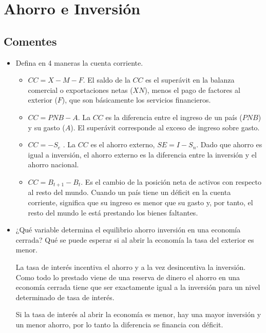 \documentclass[a4paper]{article}
\begin{document}
\section{Ahorro e Inversión}

\subsection{Comentes}

\begin{itemize}
    \item[a)] Defina en 4 maneras la cuenta corriente. 
    \begin{solution}
        \begin{itemize}
            \item $CC = X-M-F$. El saldo de la $CC$ es el superávit en la balanza comercial o exportaciones netas ($XN$), menos el pago de factores al exterior ($F$), que son básicamente los servicios financieros.
            \item $CC = PNB - A$. La $CC$ es la diferencia entre el ingreso de un país ($PNB$) y su gasto ($A$). El superávit corresponde al exceso de ingreso sobre gasto.
            \item $CC = -S_e$ . La $CC$ es el ahorro externo, $SE = I - S_n$. Dado que ahorro es igual a inversión, el ahorro externo es la diferencia entre la inversión y el ahorro nacional.
            \item $CC = B_{t+1} - B_{t}$. Es el cambio de la posición neta de activos con respecto al resto del mundo. Cuando un país tiene un déficit en la cuenta corriente, significa que su ingreso es menor que su gasto y, por tanto, el resto del mundo le está prestando los bienes faltantes.
        \end{itemize}
    \end{solution}
    \item[b)] ¿Qué variable determina el equilibrio ahorro inversión en una economía cerrada? Qué se puede esperar si al abrir la economía la tasa del exterior es menor. 
    \begin{solution}
        La tasa de interés incentiva el ahorro y a la vez desincentiva la inversión. Como todo lo prestado viene de una reserva de dinero el ahorro en una economía cerrada tiene que ser exactamente igual a la inversión para un nivel determinado de tasa de interés. 

        Si la tasa de interés al abrir la economía es menor, hay una mayor inversión y un menor ahorro, por lo tanto la diferencia se financia con déficit.


\end{solution}
\end{itemize}
\end{document}
